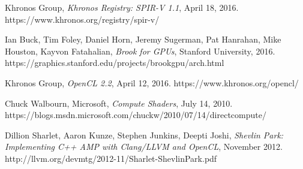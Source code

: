 \begin{thebibliography}{9}

	Khronos Group,
	\emph{Khronos Registry: SPIR-V 1.1},
	April 18, 2016.
	https://www.khronos.org/registry/spir-v/

  Ian Buck, Tim Foley, Daniel Horn, Jeremy Sugerman, Pat Hanrahan, Mike Houston, Kayvon Fatahalian,
  \emph{Brook for GPUs},
  Stanford University,
  2016.
  https://graphics.stanford.edu/projects/brookgpu/arch.html

	Khronos Group,
	\emph{OpenCL 2.2},
	April 12, 2016.
	https://www.khronos.org/opencl/

	Chuck Walbourn, Microsoft,
	\emph{Compute Shaders},
	July 14, 2010.
	https://blogs.msdn.microsoft.com/chuckw/2010/07/14/directcompute/

	Dillion Sharlet, Aaron Kunze, Stephen Junkins, Deepti Joshi,
	\emph{Shevlin Park: Implementing C++ AMP with Clang/LLVM and OpenCL},
	November 2012.
	http://llvm.org/devmtg/2012-11/Sharlet-ShevlinPark.pdf

\end{thebibliography}